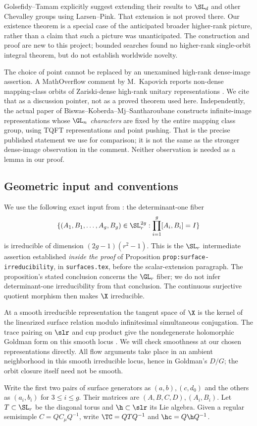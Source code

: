 Golsefidy--Tamam \cite[Section 2.4, second remark]{GT} explicitly suggest
extending their results to $\SL_d$ and other Chevalley groups using
Larsen--Pink. That extension is not proved there. Our existence theorem
is a special case of the anticipated broader higher-rank picture, rather
than a claim that such a picture was unanticipated. The construction and
proof are new to this project; bounded searches found no higher-rank
single-orbit integral theorem, but do not establish worldwide novelty.

The choice of point cannot be replaced by an unexamined high-rank
dense-image assertion. A MathOverflow comment by M.~Kapovich reports
non-dense mapping-class orbits of Zariski-dense high-rank unitary
representations \cite{MO}. We cite that as a discussion pointer, not as a
proved theorem used here. Independently, the actual paper of
Biswas--Koberda--Mj--Santharoubane
\cite[Proposition 1.2 and Section 5]{BKMS} constructs infinite-image
representations whose \emph{$\GL_n$ characters} are fixed by the entire
mapping class group, using TQFT representations and point pushing.
That is the precise published statement we use for comparison; it is
not the same as the stronger dense-image observation in the comment.
Neither observation is needed as a lemma in our proof.

\subsection{Geometric input and conventions}\label{subsec:geometry}
We use the following exact input from \cite{Source027}: the determinant-one
fiber
\[
 \{(A_1,B_1,\ldots,A_g,B_g)\in\SL_r^{2g}:
       \prod_{i=1}^g[A_i,B_i]=I\}
\]
is irreducible of dimension $(2g-1)(r^2-1)$. This is the
$\SL_r$ intermediate assertion established \emph{inside the proof} of
Proposition \texttt{prop:surface-irreducibility}, in
\texttt{surfaces.tex}, before the scalar-extension paragraph. The
proposition's stated conclusion concerns the $\GL_r$ fiber; we do not
infer determinant-one irreducibility from that conclusion. The continuous
surjective quotient morphism then makes $\X$ irreducible.

At a smooth irreducible representation the tangent space of $\X$ is the
kernel of the linearized surface relation modulo infinitesimal simultaneous
conjugation. The trace pairing on $\slr$ and cup product give the
nondegenerate holomorphic Goldman form on this smooth locus
\cite[Introduction and Sections 2--3]{Goldman}. We will check smoothness
at our chosen representations directly. All flow arguments take place in
an ambient neighborhood in this smooth irreducible locus, hence in
Goldman's $D/G$; the orbit closure itself need not be smooth.

Write the first two pairs of surface generators as $(a,b),(c,d_0)$ and the
others as $(a_i,b_i)$ for $3\leq i\leq g$. Their matrices are
$(A,B,C,D),(A_i,B_i)$. Let $T\subset\SL_r$ be the diagonal torus and
$\h\subset\slr$ its Lie algebra. Given a regular semisimple $C=QC_\mu Q^{-1}$,
write $\TC=QTQ^{-1}$ and $\hc=Q\h Q^{-1}$.
